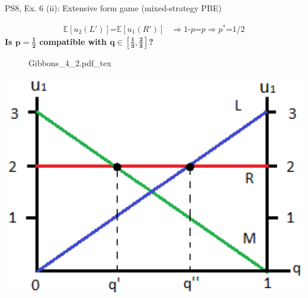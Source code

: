 \begin{frame}{PS8, Ex. 6 (ii): Extensive form game (mixed-strategy PBE)}
\begin{multicols}{2}
      \begin{align*}
        \mathbb{E}[u_2(L')]\text{=}\mathbb{E}[u_1(R')]&\Rightarrow \text{1-}p\text{=}p\Rightarrow p^*\text{=}1/2
      \end{align*}
      \textbf{Is $\bm{p=\frac{1}{2}}$ compatible with $\bm{q\in\left[\frac{1}{3},\frac{2}{3}\right]}$?}
      \vfill\null\columnbreak
      \begin{figure}[!h]
        \center {}
        {Gibbons_4_2.pdf_tex}
      \end{figure}
      \includegraphics[width=1.1\columnwidth]{figures/Gibbons_4_2_E[u]}
      \vfill\null
    \end{multicols}
\end{frame}
